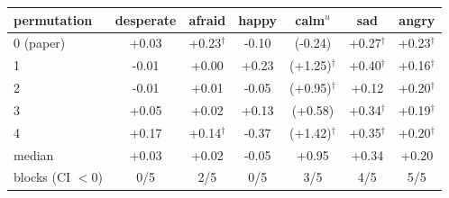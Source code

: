 \begin{tabular}{lcccccc}
\toprule
permutation & desperate & afraid & happy & calm$^{u}$ & sad & angry \\
\midrule
0 (paper) & +0.03 & +0.23$^{\dagger}$ & -0.10 & (-0.24) & +0.27$^{\dagger}$ & +0.23$^{\dagger}$ \\
1 & -0.01 & +0.00 & +0.23 & (+1.25)$^{\dagger}$ & +0.40$^{\dagger}$ & +0.16$^{\dagger}$ \\
2 & -0.01 & +0.01 & -0.05 & (+0.95)$^{\dagger}$ & +0.12 & +0.20$^{\dagger}$ \\
3 & +0.05 & +0.02 & +0.13 & (+0.58) & +0.34$^{\dagger}$ & +0.19$^{\dagger}$ \\
4 & +0.17 & +0.14$^{\dagger}$ & -0.37 & (+1.42)$^{\dagger}$ & +0.35$^{\dagger}$ & +0.20$^{\dagger}$ \\
\midrule
median & +0.03 & +0.02 & -0.05 & +0.95 & +0.34 & +0.20 \\
blocks (CI $<0$) & 0/5 & 2/5 & 0/5 & 3/5 & 4/5 & 5/5 \\
\bottomrule
\end{tabular}
